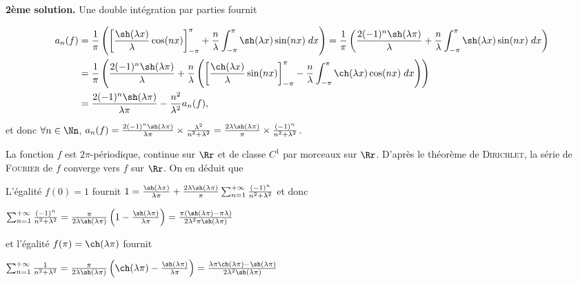 {{\begin{enumerate}
\textbf{2ème solution.} Une double intégration par parties fournit

\begin{align*}\ensuremath
a_n(f)&=\frac{1}{\pi}\left(\left[\frac{\sh(\lambda x)}{\lambda}\cos(nx)\right]_{-\pi}^{\pi}+\frac{n}{\lambda}\int_{-\pi}^{\pi}\sh(\lambda x)\sin(nx)\;dx\right)=\frac{1}{\pi}\left(\frac{2(-1)^n\sh(\lambda\pi)}{\lambda}+\frac{n}{\lambda}\int_{-\pi}^{\pi}\sh(\lambda x)\sin(nx)\;dx\right)\\
 &=\frac{1}{\pi}\left(\frac{2(-1)^n\sh(\lambda\pi)}{\lambda}+\frac{n}{\lambda}\left(\left[\frac{\ch(\lambda x)}{\lambda}\sin(nx)\right]_{-\pi}^{\pi}-\frac{n}{\lambda}\int_{-\pi}^{\pi}\ch(\lambda x)\cos(nx)\;dx\right)\right)\\
 &=\frac{2(-1)^n\sh(\lambda\pi)}{\lambda\pi}-\frac{n^2}{\lambda^2}a_n(f),
\end{align*}

et donc $\forall n\in\Nn$, $a_n(f)=\frac{2(-1)^n\sh(\lambda\pi)}{\lambda\pi}\times\frac{\lambda^2}{n^2+\lambda^2}=\frac{2\lambda\sh(\lambda\pi)}{\pi}\times\frac{(-1)^n}{n^2+\lambda^2}$.

La fonction $f$ est $2\pi$-périodique, continue sur $\Rr$ et de classe $C^1$ par morceaux sur $\Rr$. D'après le théorème de \textsc{Dirichlet}, la série de \textsc{Fourier} de $f$ converge vers $f$ sur $\Rr$. On en déduit que

\begin{center}
\end{center}

L'égalité $f(0)=1$ fournit $1=\frac{\sh(\lambda\pi)}{\lambda\pi}+\frac{2\lambda\sh(\lambda\pi)}{\pi}\sum_{n=1}^{+\infty}\frac{(-1)^n}{n^2+\lambda^2}$ et donc

\begin{center}
$\sum_{n=1}^{+\infty}\frac{(-1)^n}{n^2+\lambda^2}=\frac{\pi}{2\lambda\sh(\lambda\pi)}\left(1-\frac{\sh(\lambda\pi)}{\lambda\pi}\right)=\frac{\pi\left(\sh(\lambda\pi)-\pi\lambda\right)}{2\lambda^2\pi\sh(\lambda\pi)}$
\end{center}

et l'égalité $f(\pi)=\ch(\lambda\pi)$ fournit 

\begin{center}
$\sum_{n=1}^{+\infty}\frac{1}{n^2+\lambda^2}=\frac{\pi}{2\lambda\sh(\lambda\pi)}\left(\ch(\lambda\pi)-\frac{\sh(\lambda\pi)}{\lambda\pi}\right)=\frac{\lambda\pi\ch(\lambda\pi)-\sh(\lambda\pi)}{2\lambda^2\sh(\lambda\pi)}$
\end{center}


\end{enumerate}}}
